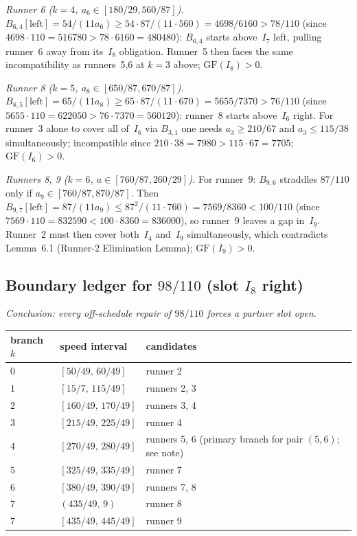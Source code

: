 \documentclass[12pt]{article}
\begin{document}
\emph{Runner 6 ($k=4$, $a_6\in[180/29,560/87]$).}
$B_{6,4}[\mathrm{left}]=54/(11a_6)\ge54\cdot87/(11\cdot560)=4698/6160>78/110$
(since $4698\cdot110=516780>78\cdot6160=480480$): $B_{6,4}$ starts above~$I_7$ left,
pulling runner~6 away from its~$I_8$ obligation. Runner~5 then faces the same
incompatibility as runners~5,6 at $k=3$ above; $\mathrm{GF}(I_8)>0$.

\emph{Runner 8 ($k=5$, $a_8\in[650/87,670/87]$).}
$B_{8,5}[\mathrm{left}]=65/(11a_8)\ge65\cdot87/(11\cdot670)=5655/7370>76/110$
(since $5655\cdot110=622050>76\cdot7370=560120$): runner~8 starts above~$I_6$ right.
For runner~3 alone to cover all of~$I_6$ via $B_{3,1}$ one needs $a_3\ge210/67$
and $a_3\le115/38$ simultaneously; incompatible since $210\cdot38=7980>115\cdot67=7705$;
$\mathrm{GF}(I_6)>0$.

\emph{Runners 8, 9 ($k=6$, $a\in[760/87,260/29]$).}
For runner~9: $B_{9,6}$ straddles $87/110$ only if $a_9\in[760/87,870/87]$.
Then $B_{9,7}[\mathrm{left}]=87/(11a_9)\le87^2/(11\cdot760)=7569/8360<100/110$
(since $7569\cdot110=832590<100\cdot8360=836000$), so runner~9 leaves a gap in~$I_9$.
Runner~2 must then cover both~$I_4$ and~$I_9$ simultaneously, which contradicts
Lemma~6.1 (Runner-2 Elimination Lemma); $\mathrm{GF}(I_9)>0$.

\subsection{Boundary ledger for $98/110$ (slot $I_8$ right)}

\emph{Conclusion: every off-schedule repair of $98/110$ forces a partner slot open.}

\begin{center}
\begin{tabular}{@{}lll@{}}
\toprule
branch $k$ & speed interval & candidates \\
\midrule
$0$ & $[50/49,\,60/49]$ & runner 2 \\
$1$ & $[15/7,\,115/49]$ & runners 2, 3 \\
$2$ & $[160/49,\,170/49]$ & runners 3, 4 \\
$3$ & $[215/49,\,225/49]$ & runner 4 \\
$4$ & $[270/49,\,280/49]$ & runners 5, 6 (primary branch for pair $(5,6)$; see note) \\
$5$ & $[325/49,\,335/49]$ & runner 7 \\
$6$ & $[380/49,\,390/49]$ & runners 7, 8 \\
$7$ & $(435/49,\,9)$ & runner 8 \\
$7$ & $[435/49,\,445/49]$ & runner 9 \\
\bottomrule
\end{tabular}
\end{center}
\end{document}
